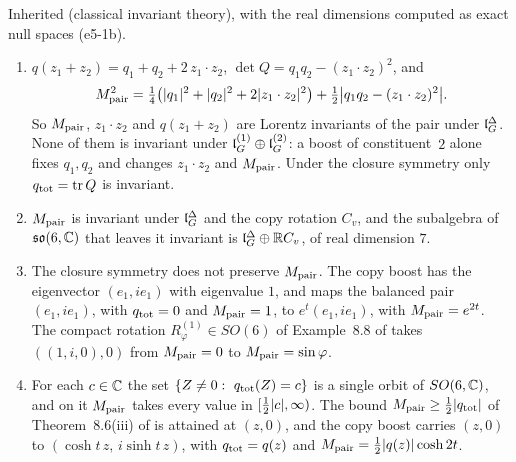 Inherited (classical invariant theory), with the real dimensions computed as exact null spaces (e5-1b).

\begin{theorem}
\label{e5:thm:pair}
\begin{enumerate}[label=(\roman*),leftmargin=2.2em]
\item $q(z_1+z_2)=q_1+q_2+2\,z_1\cdot z_2$, $\det Q=q_1q_2-(z_1\cdot z_2)^2$, and
\[
M_{\rm pair}^2=\tfrac14\bigl(|q_1|^2+|q_2|^2+2|z_1\cdot z_2|^2\bigr)+\tfrac12\bigl|q_1q_2-(z_1\cdot z_2)^2\bigr| .
\]
So $M_{\rm pair}$, $z_1\cdot z_2$ and $q(z_1+z_2)$ are Lorentz invariants of the pair under $\mathfrak l_G^\Delta$. None of them is invariant under
$\mathfrak l_G^{(1)}\oplus\mathfrak l_G^{(2)}$: a boost of constituent~$2$ alone fixes $q_1,q_2$ and changes $z_1\cdot z_2$ and $M_{\rm pair}$. Under the closure
symmetry only $q_{\rm tot}=\operatorname{tr} Q$ is invariant.
\item $M_{\rm pair}$ is invariant under $\mathfrak l_G^\Delta$ and the copy rotation $C_v$, and the subalgebra of $\mathfrak{so}(6,\mathbb{C})$ that leaves it invariant
is $\mathfrak l_G^\Delta\oplus\mathbb{R} C_v$, of real dimension $7$.
\item The closure symmetry does not preserve $M_{\rm pair}$. The copy boost has the eigenvector $(e_1,ie_1)$ with eigenvalue $1$, and maps the
balanced pair $(e_1,ie_1)$, with $q_{\rm tot}=0$ and $M_{\rm pair}=1$, to $e^t(e_1,ie_1)$, with $M_{\rm pair}=e^{2t}$. The compact rotation
$R^{(1)}_\varphi\in SO(6)$ of Example~8.8 of \cite{RE} takes $((1,i,0),0)$ from $M_{\rm pair}=0$ to $M_{\rm pair}=\sin\varphi$.
\item For each $c\in\mathbb{C}$ the set $\{Z\neq0:\ q_{\rm tot}(Z)=c\}$ is a single orbit of $SO(6,\mathbb{C})$, and on it $M_{\rm pair}$ takes every value in
$[\tfrac12|c|,\infty)$. The bound $M_{\rm pair}\ge\tfrac12|q_{\rm tot}|$ of Theorem~8.6(iii) of \cite{RE} is attained at $(z,0)$, and the copy boost
carries $(z,0)$ to $(\cosh t\,z,\,i\sinh t\,z)$, with $q_{\rm tot}=q(z)$ and $M_{\rm pair}=\tfrac12|q(z)|\cosh2t$.
\end{enumerate}
\end{theorem}

